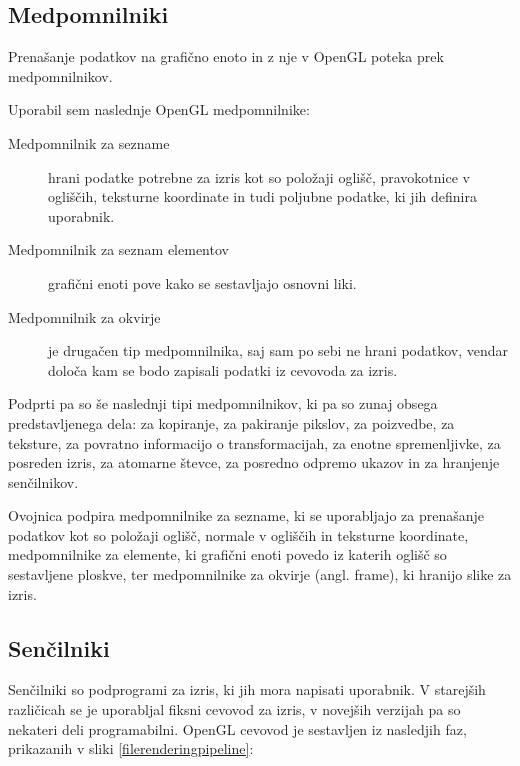 \documentclass[a4paper, 12pt]{book}
\begin{document}
\subsection*{Medpomnilniki}

Prenašanje podatkov na grafično enoto in z nje v OpenGL poteka prek medpomnilnikov. 

Uporabil sem naslednje OpenGL medpomnilnike:
\begin{description}

\item [Medpomnilnik za sezname] hrani podatke potrebne za izris kot so položaji oglišč, pravokotnice v ogliščih, teksturne koordinate in tudi poljubne podatke, ki jih definira uporabnik.

\item [Medpomnilnik za seznam elementov] grafični enoti pove kako se sestavljajo osnovni liki.

\item [Medpomnilnik za okvirje] je drugačen tip medpomnilnika, saj sam po sebi ne hrani podatkov, vendar določa kam se bodo zapisali podatki iz cevovoda za izris.

\end{description}
Podprti pa so še naslednji tipi medpomnilnikov, ki pa so zunaj obsega predstavljenega dela: za kopiranje, za pakiranje pikslov, za poizvedbe, za teksture, za povratno informacijo o transformacijah, za enotne spremenljivke, za posreden izris, za atomarne števce, za posredno odpremo ukazov in za hranjenje senčilnikov.


Ovojnica podpira medpomnilnike za sezname, ki se uporabljajo za prenašanje podatkov kot so položaji oglišč, normale v ogliščih in teksturne koordinate, medpomnilnike za elemente, ki grafični enoti povedo iz katerih oglišč so sestavljene ploskve, ter medpomnilnike za okvirje (angl. frame), ki hranijo slike za izris.

\subsection*{Senčilniki}

Senčilniki so podprogrami za izris, ki jih mora napisati uporabnik. V starejših različicah se je uporabljal fiksni cevovod za izris, v novejših verzijah pa so nekateri deli programabilni. OpenGL cevovod je sestavljen iz nasledjih faz, prikazanih v sliki \ref{filerenderingpipeline}:
\end{document}
